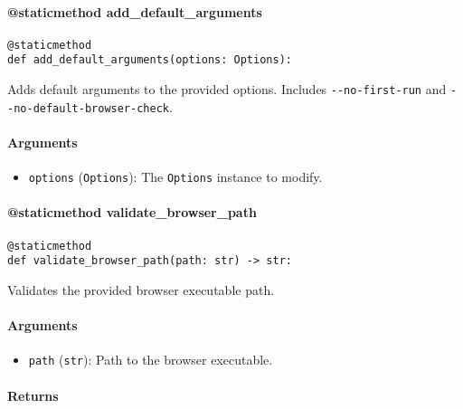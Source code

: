 \documentclass{article}
\begin{document}
\paragraph{@staticmethod add\_default\_arguments}

\begin{lstlisting}[style=pythonstyle]
@staticmethod
def add_default_arguments(options: Options):
\end{lstlisting}

\noindent Adds default arguments to the provided options. Includes \lstinline[style=pythonstyle]|--no-first-run| and \lstinline[style=pythonstyle]|--no-default-browser-check|.

\paragraph{Arguments}

\begin{itemize}
    \item \lstinline[style=pythonstyle]|options| (\lstinline[style=pythonstyle]|Options|): The \lstinline[style=pythonstyle]|Options| instance to modify.
\end{itemize}

\paragraph{@staticmethod validate\_browser\_path}

\begin{lstlisting}[style=pythonstyle]
@staticmethod
def validate_browser_path(path: str) -> str:
\end{lstlisting}

\noindent Validates the provided browser executable path.

\paragraph{Arguments}

\begin{itemize}
    \item \lstinline[style=pythonstyle]|path| (\lstinline[style=pythonstyle]|str|): Path to the browser executable.
\end{itemize}

\paragraph{Returns}
\end{document}
